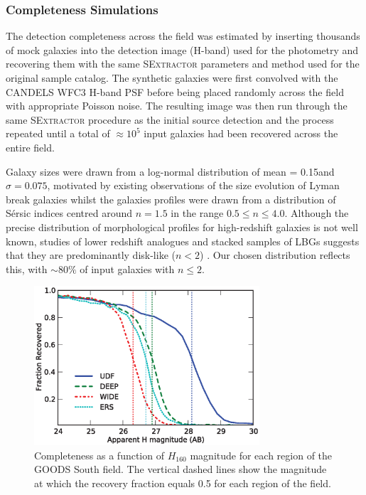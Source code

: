 \subsubsection{Completeness Simulations}\label{sec:completeness}
The detection completeness across the field was estimated by inserting thousands of mock galaxies into the detection image (H-band) used for the photometry and recovering them with the same \textsc{SExtractor} parameters and method used for the original sample catalog. The synthetic galaxies were first convolved with the CANDELS WFC3 H-band PSF before being placed randomly across the field with appropriate Poisson noise. The resulting image was then run through the same \textsc{SExtractor} procedure as the initial source detection and the process repeated until a total of $\approx  10^{5}$ input galaxies had been recovered across the entire field.

Galaxy sizes were drawn from a log-normal distribution of mean = 0.15\arcsec and $\sigma = 0.075$, motivated by existing observations of the size evolution of Lyman break galaxies \citep{2004ApJ...600L.107F,2010ApJ...709L..21O,2011A&A...532A..33G,Huang:2013kb} whilst the galaxies profiles were drawn from a distribution of S\'{e}rsic indices centred around $n=1.5$ in the range $0.5 \le n \le 4.0$. Although the precise distribution of morphological profiles for high-redshift galaxies is not well known, studies of lower redshift analogues and stacked samples of LBGs suggests that they are predominantly disk-like ($n < 2$) \citep{Ravindranath:2006ie,Hathi:2007fh}. Our chosen distribution reflects this, with $\sim 80\%$ of input galaxies with $n \leq 2$.

\begin{figure}
\includegraphics[width=84mm]{plots/fig3.eps}

\caption{Completeness as a function of $H_{160}$ magnitude for each region of the GOODS South field. The vertical dashed lines show the magnitude at which the recovery fraction equals 0.5 for each region of the field.}
\label{fig:completeness}
\end{figure}

